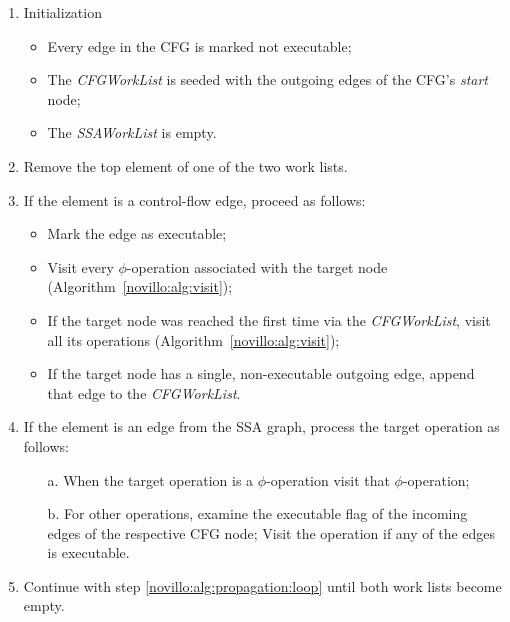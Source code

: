 \begin{algorithm}[h!]
  \begin{enumerate}
    \item Initialization
          \begin{itemize}
            \vspace{-1.2ex}
            \item Every edge in the CFG is marked not executable;
            \item The \emph{CFGWorkList} is seeded with the outgoing edges
                  of the CFG's \emph{start} node;
            \item The \emph{SSAWorkList} is empty.
          \end{itemize}
          \vspace{-1ex}
    \item \label{novillo:alg:propagation:loop} Remove the top element of one
          of the two work lists.
    \item \label{novillo:alg:propagation:flowedge} If the element is 
      a control-flow edge, proceed as follows:
          \begin{itemize}
            \vspace{-1.2ex}
            \item Mark the edge as executable;
            \item Visit every $\phi$-operation associated with the target
                  node (Algorithm~\ref{novillo:alg:visit});
            \item If the target node was reached the first time via the
                  \emph{CFGWorkList}, visit all its operations (Algorithm~\ref{novillo:alg:visit});
            \item If the target node has a single, non-executable outgoing
                  edge, append that edge to the \emph{CFGWorkList}.
          \end{itemize}
          \vspace{-1ex}
    \item \label{novillo:alg:propagation:ssaedge} If the element is an edge from
          the SSA graph, process the target operation as follows:
          \begin{enumerate}
            \vspace{-1.2ex}
            \item[a.] When the target operation is a $\phi$-operation visit that
                      $\phi$-operation;
            \item[b.] \label{novillo:alg:propagation:ssaedge:regular} For other
                      operations, examine the executable flag of the incoming
                      edges of the respective CFG node; Visit the operation
                      if any of the edges is executable.
          \end{enumerate}
          \vspace{-1ex}
    \item Continue with step \ref{novillo:alg:propagation:loop} until both work
          lists become empty.
  \end{enumerate}


\end{algorithm}
